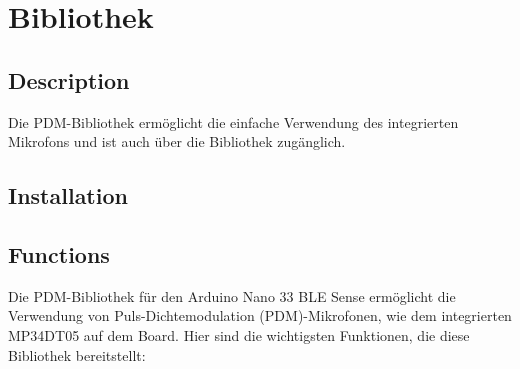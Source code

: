 \section{Bibliothek }

\subsection{Description}

Die PDM-Bibliothek ermöglicht die einfache Verwendung des integrierten Mikrofons und ist auch über die Bibliothek  zugänglich.

\subsection{Installation}

\subsection{Functions}

Die PDM-Bibliothek für den Arduino Nano 33 BLE Sense ermöglicht die Verwendung von Puls-Dichtemodulation (PDM)-Mikrofonen, wie dem integrierten MP34DT05 auf dem Board. Hier sind die wichtigsten Funktionen, die diese Bibliothek bereitstellt:

